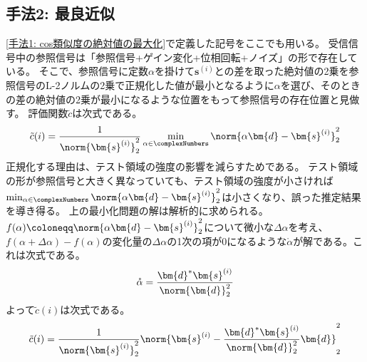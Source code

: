         \subsection{手法2: 最良近似}
            \ref{手法1: cos類似度の絶対値の最大化}で定義した記号をここでも用いる。
            受信信号中の参照信号は「参照信号+ゲイン変化+位相回転+ノイズ」の形で存在している。
            そこで、参照信号に定数$\alpha$を掛けて$\bm{s}^{(i)}$との差を取った絶対値の2乗を参照信号のL-2ノルムの2乗で正規化した値が最小となるように$\alpha$を選び、そのときの差の絶対値の2乗が最小になるような位置をもって参照信号の存在位置と見做す。
            評価関数$\tilde{c}$は次式である。
            \[ \tilde{c}(i) = \frac{1}{\norm{\bm{s}^{(i)}}_2^2}\min_{\alpha \in \complexNumbers}\norm{\alpha\bm{d} - \bm{s}^{(i)}}_2^2 \]
            正規化する理由は、テスト領域の強度の影響を減らすためである。
            テスト領域の形が参照信号と大きく異なっていても、テスト領域の強度が小さければ$\min_{\alpha \in \complexNumbers}\norm{\alpha\bm{d} - \bm{s}^{(i)}}_2^2$は小さくなり、誤った推定結果を導き得る。
            上の最小化問題の解は解析的に求められる。
            $f(\alpha) \coloneqq \norm{\alpha\bm{d} - \bm{s}^{(i)}}_2^2$について微小な$\Delta\alpha$を考え、$f(\alpha+\Delta\alpha) - f(\alpha)$の変化量の$\Delta\alpha$の1次の項が0になるような$\mathring{\alpha}$が解である。これは次式である。
            \[
                \mathring{\alpha} = \frac{\bm{d}^*\bm{s}^{(i)}}{\norm{\bm{d}}_2^2}
            \]
            よって$\tilde{c}(i)$は次式である。
            \[ \tilde{c}(i) = \frac{1}{\norm{\bm{s}^{(i)}}_2^2}\norm{\bm{s}^{(i)} - \frac{\bm{d}^*\bm{s}^{(i)}}{\norm{\bm{d}}_2^2}\bm{d}}_2^2 \]
